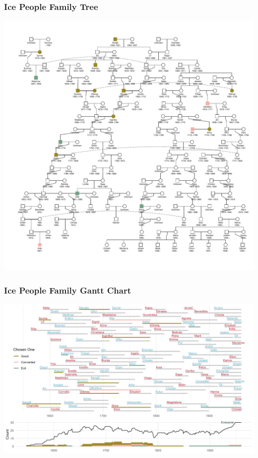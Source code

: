 \begin{frame}
    \frametitle{Ice People Family Tree}
    \centering
    \includegraphics[height=\textheight]{../R/figures/family_tree}
\end{frame}

\begin{frame}
    \frametitle{Ice People Family Gantt Chart}
    \centering
    \includegraphics[width=\textwidth]{../R/figures/family_gantt}
\end{frame}

